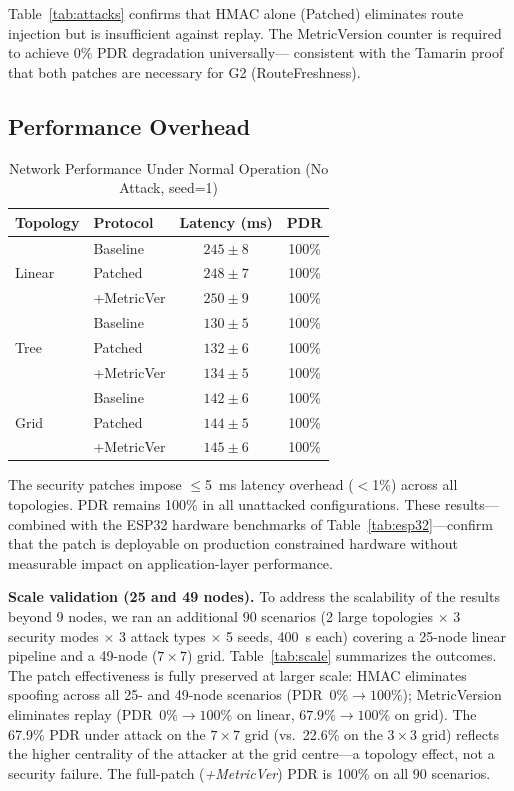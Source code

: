 \documentclass[preprint,12pt]{elsarticle}
\begin{document}
Table~\ref{tab:attacks} confirms that HMAC alone (Patched) eliminates
route injection but is insufficient against replay. The MetricVersion
counter is required to achieve 0\% PDR degradation universally—
consistent with the Tamarin proof that both patches are necessary
for G2 (RouteFreshness).

\subsection{Performance Overhead}

\begin{table}[t]
  \centering
  \caption{Network Performance Under Normal Operation (No Attack, seed=1)}
  \label{tab:overhead}
  \begin{tabular}{llcc}
    \toprule
    \textbf{Topology} & \textbf{Protocol} & \textbf{Latency (ms)} & \textbf{PDR} \\
    \midrule
    \multirow{3}{*}{Linear}
      & Baseline      & $245 \pm 8$  & 100\% \\
      & Patched       & $248 \pm 7$  & 100\% \\
      & +MetricVer    & $250 \pm 9$  & 100\% \\
    \midrule
    \multirow{3}{*}{Tree}
      & Baseline      & $130 \pm 5$  & 100\% \\
      & Patched       & $132 \pm 6$  & 100\% \\
      & +MetricVer    & $134 \pm 5$  & 100\% \\
    \midrule
    \multirow{3}{*}{Grid}
      & Baseline      & $142 \pm 6$  & 100\% \\
      & Patched       & $144 \pm 5$  & 100\% \\
      & +MetricVer    & $145 \pm 6$  & 100\% \\
    \bottomrule
  \end{tabular}
\end{table}

The security patches impose $\leq$5~ms latency overhead ($<$1\%)
across all topologies. PDR remains 100\% in all unattacked
configurations. These results—combined with the ESP32 hardware
benchmarks of Table~\ref{tab:esp32}—confirm that the patch is
deployable on production constrained hardware without measurable impact on
application-layer performance.

\textbf{Scale validation (25 and 49 nodes).}
To address the scalability of the results beyond 9 nodes, we ran an
additional 90 scenarios (2 large topologies $\times$ 3 security modes
$\times$ 3 attack types $\times$ 5 seeds, 400~s each) covering a
25-node linear pipeline and a 49-node ($7\times7$) grid.
Table~\ref{tab:scale} summarizes the outcomes.
The patch effectiveness is fully preserved at larger scale:
HMAC eliminates spoofing across all 25- and 49-node scenarios
(PDR~$0\% \to 100\%$); MetricVersion eliminates replay
(PDR~$0\% \to 100\%$ on linear, $67.9\% \to 100\%$ on grid).
The 67.9\% PDR under attack on the $7\times7$ grid (vs.\ 22.6\% on
the $3\times3$ grid) reflects the higher centrality of the attacker
at the grid centre—a topology effect, not a security failure.
The full-patch (\textit{+MetricVer}) PDR is 100\% on all 90 scenarios.
\end{document}
